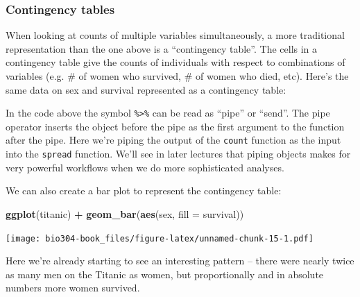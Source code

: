 \documentclass[]{book}
\newenvironment{Shaded}{\begin{snugshade}}{\end{snugshade}}
\newcommand{\CommentTok}[1]{\textcolor[rgb]{0.56,0.35,0.01}{\textit{#1}}}
\newcommand{\DataTypeTok}[1]{\textcolor[rgb]{0.13,0.29,0.53}{#1}}
\newcommand{\KeywordTok}[1]{\textcolor[rgb]{0.13,0.29,0.53}{\textbf{#1}}}
\newcommand{\NormalTok}[1]{#1}
\newcommand{\OperatorTok}[1]{\textcolor[rgb]{0.81,0.36,0.00}{\textbf{#1}}}
\newcommand{\StringTok}[1]{\textcolor[rgb]{0.31,0.60,0.02}{#1}}
\theoremstyle{definition}
\theoremstyle{definition}
\theoremstyle{definition}
\theoremstyle{remark}
\begin{document}
\hypertarget{contingency-tables}{%
\subsubsection{Contingency tables}\label{contingency-tables}}

When looking at counts of multiple variables simultaneously, a more
traditional representation than the one above is a ``contingency
table''. The cells in a contingency table give the counts of individuals
with respect to combinations of variables (e.g. \# of women who
survived, \# of women who died, etc). Here's the same data on sex and
survival represented as a contingency table:

\begin{Shaded}
\end{Shaded}

In the code above the symbol \texttt{\%\textgreater{}\%} can be read as
``pipe'' or ``send''. The pipe operator inserts the object before the
pipe as the first argument to the function after the pipe. Here we're
piping the output of the \texttt{count} function as the input into the
\texttt{spread} function. We'll see in later lectures that piping
objects makes for very powerful workflows when we do more sophisticated
analyses.

We can also create a bar plot to represent the contingency table:

\begin{Shaded}
\begin{Highlighting}[]
\KeywordTok{ggplot}\NormalTok{(titanic) }\OperatorTok{+}
\StringTok{  }\KeywordTok{geom_bar}\NormalTok{(}\KeywordTok{aes}\NormalTok{(sex, }\DataTypeTok{fill =}\NormalTok{ survival))}
\end{Highlighting}
\end{Shaded}

\texttt{[image: bio304-book\_files/figure-latex/unnamed-chunk-15-1.pdf]}

Here we're already starting to see an interesting pattern -- there were
nearly twice as many men on the Titanic as women, but proportionally and
in absolute numbers more women survived.
\end{document}
